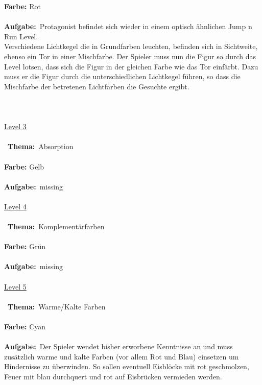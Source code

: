 \documentclass[10pt,a4paper,notitlepage]{report}
\begin{document}
	\textbf{Farbe:} Rot\
	\\\\
	\textbf{Aufgabe:}\	
	Protagonist befindet sich wieder in einem optisch ähnlichen Jump n Run Level.\\
	Verschiedene Lichtkegel die in Grundfarben leuchten, befinden sich in Sichtweite, ebenso ein Tor in einer Mischfarbe.
	 Der Spieler muss nun die Figur so durch das Level lotsen, dass sich die Figur in der gleichen Farbe wie das Tor einfärbt. 
	Dazu muss er die Figur durch die unterschiedlichen Lichtkegel führen, so dass die Mischfarbe der betretenen Lichtfarben die Gesuchte ergibt.\\
	\\\\
	\clearpage\
	\marginpar{\vspace{3.0mm} \color{orange}\rule{0.8mm}{53.3mm} \\[3mm] \color{hellorange}\rule{0.8mm}{170mm}}
	\\
	\underline{Level 3}\\\\\
	\textbf{Thema:}\
	Absorption
	\\\\
	\textbf{Farbe:} Gelb\
	\\\\
	\textbf{Aufgabe:}\
	missing
	\\\\
	\underline{Level 4}\\\\\
	\textbf{Thema:}\
	Komplementärfarben
	\\\\
	\textbf{Farbe:} Grün\
	\\\\
	\textbf{Aufgabe:}\
	missing
	\\\\
	\underline{Level 5}\\\\\
	\textbf{Thema:}\
	Warme/Kalte Farben
	\\\\
	\textbf{Farbe:} Cyan\
	\\\\
	\textbf{Aufgabe:}\
	Der Spieler wendet bisher erworbene Kenntnisse an und muss zusätzlich warme und kalte Farben (vor allem Rot und Blau) einsetzen um Hindernisse zu 			überwinden. So sollen eventuell Eisblöcke mit rot geschmolzen, Feuer mit blau durchquert und rot auf Eisbrücken vermieden werden.
	\\\\
\end{document}

